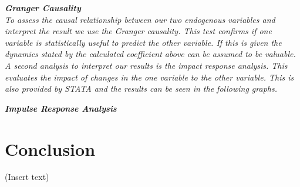 \documentclass[a4paper,american,12pt]{article}
\begin{document}
\begin{spacing}{1.2}
		\itshape\textbf {Granger Causality}\\
		\textnormal {To assess the causal relationship between our two endogenous variables and interpret the result we use the Granger causality. This test confirms if one variable is statistically useful to predict the other variable. If this is given the dynamics stated by the calculated coefficient above can be assumed to be valuable.\\
A second analysis to interpret our results is the impact response analysis. This evaluates the impact of changes in the one variable to the other variable. This is also provided by STATA and the results can be seen in the following graphs.}

		\itshape\textbf {Impulse Response Analysis}\\
					
		\clearpage
		
		\section{Conclusion}
		\textnormal {(Insert text)}
		
		\clearpage
		
	\end{spacing}

\clearpage

\printbibliography
\clearpage

\end{document}
